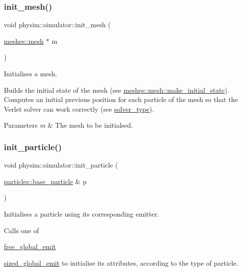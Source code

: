\subsubsection{\texorpdfstring{init\+\_\+mesh()}{init\_mesh()}}
{\footnotesize\ttfamily void physim\+::simulator\+::init\+\_\+mesh (\begin{DoxyParamCaption}\item[{\hyperlink{classphysim_1_1meshes_1_1mesh}{meshes\+::mesh} $\ast$}]{m }\end{DoxyParamCaption})\hspace{0.3cm}{\ttfamily [private]}}



Initialises a mesh. 

Builds the initial state of the mesh (see \hyperlink{classphysim_1_1meshes_1_1mesh_a62f877dd42bc306ef70c76fc172f245f}{meshes\+::mesh\+::make\+\_\+initial\+\_\+state}). Computes an initial previous position for each particle of the mesh so that the Verlet solver can work correctly (see \hyperlink{namespacephysim_a09adeda29c09e651877e880d31fc9686}{solver\+\_\+type}). 
\begin{DoxyParams}{Parameters}
{\em m} & The mesh to be initialsed. \\
\hline
\end{DoxyParams}
\mbox{\label{classphysim_1_1simulator_a55759abc6a93f89e3244bc16518c7fe4}} 
\subsubsection{\texorpdfstring{init\+\_\+particle()}{init\_particle()}}
{\footnotesize\ttfamily void physim\+::simulator\+::init\+\_\+particle (\begin{DoxyParamCaption}\item[{\hyperlink{classphysim_1_1particles_1_1base__particle}{particles\+::base\+\_\+particle} \&}]{p }\end{DoxyParamCaption})\hspace{0.3cm}{\ttfamily [private]}}



Initialises a particle using its corresponding emitter. 

Calls one of
\begin{DoxyItemize}
\item \hyperlink{classphysim_1_1simulator_a05e2840fc39c644d7005ea938e63202f}{free\+\_\+global\+\_\+emit}
\item \hyperlink{classphysim_1_1simulator_a61d4f20480309e95fce1db56b7fc8a88}{sized\+\_\+global\+\_\+emit} to initialise its attributes, according to the type of particle.
\end{DoxyItemize}

